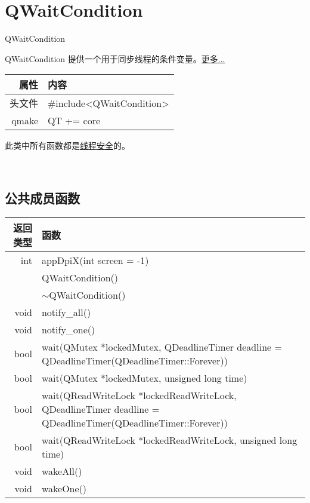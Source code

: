 \chapter{QWaitCondition}

QWaitCondition

QWaitCondition 提供一个用于同步线程的条件变量。\href{https://github.com/QtDocumentCN/QtDocumentCN/blob/master/Src/W/QWaitCondition/QWaitCondition.md#%E8%AF%A6%E7%BB%86%E6%8F%8F%E8%BF%B0}{更多...} 
	
\begin{tabular}{|r|l|}
	\hline
	属性 & 内容 \\
	\hline
	头文件 & \#include<QWaitCondition>\\      
	\hline
	qmake & QT += core\\      
	\hline
\end{tabular}

\begin{notice}
	此类中所有函数都是\href{https://github.com/QtDocumentCN/QtDocumentCN/blob/master/Src/R/Reentrancy_and_Thread-Safety/Reentrancy_and_Thread-Safety.md}{线程安全}的。
\end{notice}

 	
\section{公共成员函数}

\begin{tabular}{|r|l|}
	\hline
	返回类型 & 函数 \\
	\hline
	int	& appDpiX(int screen = -1)\\
	\hline
	&QWaitCondition()\\
	\hline
	& $\sim$QWaitCondition()\\
	\hline
	void &	notify\_all()\\
	\hline
	void	&notify\_one()\\
		\hline
	bool&	wait(QMutex *lockedMutex, QDeadlineTimer deadline = QDeadlineTimer(QDeadlineTimer::Forever)) \\
	\hline
	bool &	wait(QMutex *lockedMutex, unsigned long time) \\
	\hline
	bool&	wait(QReadWriteLock *lockedReadWriteLock, QDeadlineTimer deadline = QDeadlineTimer(QDeadlineTimer::Forever)) \\
	\hline
	bool &	wait(QReadWriteLock *lockedReadWriteLock, unsigned long time) \\
	void &	wakeAll()\\
	\hline
	void &	wakeOne()\\
	\hline
\end{tabular}

